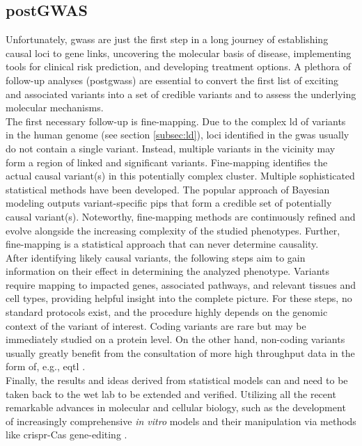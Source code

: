     \subsection{postGWAS}
    \label{subsec:gwas_limit}
    Unfortunately, \acp{gwas} are just the first step in a long journey of establishing causal loci to gene links, uncovering the molecular basis of disease, implementing tools for clinical risk prediction, and developing treatment options. A plethora of follow-up analyses (post\acp{gwas}) are essential to convert the first list of exciting and associated variants into a set of credible variants and to assess the underlying molecular mechanisms.\\
    The first necessary follow-up is fine-mapping. Due to the complex \ac{ld} of variants in the human genome (see section \ref{subsec:ld}), loci identified in the \ac{gwas} usually do not contain a single variant. Instead, multiple variants in the vicinity may form a region of linked and significant variants. Fine-mapping identifies the actual causal variant(s) in this potentially complex cluster. Multiple sophisticated statistical methods have been developed. The popular approach of Bayesian modeling outputs variant-specific \acp{pip} that form a credible set of potentially causal variant(s). Noteworthy, fine-mapping methods are continuously refined and evolve alongside the increasing complexity of the studied phenotypes. Further, fine-mapping is a statistical approach that can never determine causality. \cite{schaidGenomewideAssociationsCandidate2018, uffelmannGenomewideAssociationStudies2021}\\
    After identifying likely causal variants, the following steps aim to gain information on their effect in determining the analyzed phenotype. Variants require mapping to impacted genes, associated pathways, and relevant tissues and cell types, providing helpful insight into the complete picture. For these steps, no standard protocols exist, and the procedure highly depends on the genomic context of the variant of interest. Coding variants are rare but may be immediately studied on a protein level. On the other hand, non-coding variants usually greatly benefit from the consultation of more high throughput data in the form of, e.g., \ac{eqtl} \cite{uffelmannGenomewideAssociationStudies2021}.\\
    Finally, the results and ideas derived from statistical models can and need to be taken back to the wet lab to be extended and verified. Utilizing all the recent remarkable advances in molecular and cellular biology, such as the development of increasingly comprehensive \textit{in vitro} models and their manipulation via methods like \ac{crispr}-Cas gene-editing \cite{lichouFunctionalStudiesGWAS2020}.



